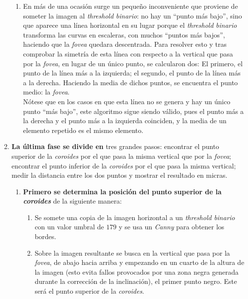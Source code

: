 \begin{enumerate}
\begin{enumerate}[label*=\arabic*.]
  \item En más de una ocasión surge un pequeño inconveniente que
    proviene de someter la imagen al \emph{threshold binario}: no hay
    un ``punto más bajo'', sino que aparece una línea horizontal en su
    lugar porque el \emph{threshold binario} transforma las curvas en
    escaleras, con muchos ``puntos más bajos'', haciendo que la
    \emph{\gls{fovea}} quedara descentrada. Para resolver esto y tras
    comprobar la simetría de esta línea con respecto a la vertical que
    pasa por la \emph{\gls{fovea}}, en lugar de un único punto, se
    calcularon dos: El primero, el punto de la línea más a la
    izquierda; el segundo, el punto de la línea más a la
    derecha. Haciendo la media de dichos
    puntos, se encuentra el punto medio: la \emph{\gls{fovea}}. \\
    Nótese que en los casos en que esta línea no se genera y hay un
    único punto ``más bajo'', este algoritmo sigue siendo válido, pues
    el punto más a la derecha y el punto más a la izquierda coinciden,
    y la media de un elemento repetido es el mismo elemento.
  \end{enumerate}
\item \textbf{La última fase se divide en} tres grandes pasos:
  encontrar el punto superior de la \emph{\gls{coroides}} por el que pasa la
  misma vertical que por la \emph{\gls{fovea}}; encontrar el punto inferior
  de la \emph{\gls{coroides}} por el que pasa la misma vertical; medir la
  distancia entre los dos puntos y mostrar el resultado en micras.
  \begin{enumerate}[label*=\arabic*.]
  \item \textbf{Primero se determina la posición del punto superior de
      la \emph{\gls{coroides}}} de la siguiente manera:
    \begin{enumerate}[label*=\arabic*.]
    \item Se somete una copia de la imagen horizontal a un
      \emph{threshold binario} con un valor umbral de $179$ y se usa
      un \emph{Canny} para obtener los bordes.
    \item Sobre la imagen resultante se busca en la vertical que pasa
      por la \emph{\gls{fovea}}, de abajo hacia arriba y empezando en un
      cuarto de la altura de la imagen (esto evita fallos provocados
      por una zona negra generada durante la corrección de la
      inclinación), el primer punto negro. Este será el punto superior
      de la \emph{\gls{coroides}}.
    \end{enumerate}

\end{enumerate}
\end{enumerate}
